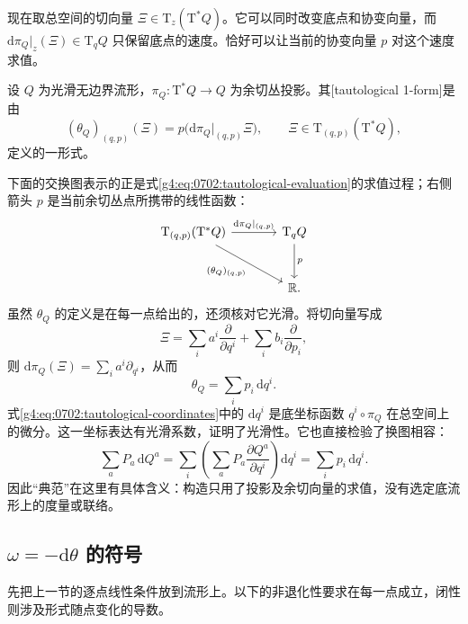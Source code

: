 现在取总空间的切向量 \(\Xi\in\mathrm{T}_z(\mathrm{T}^*Q)\)。它可以同时改变底点和协变向量，而 \(\mathrm{d}\pi_Q|_z(\Xi)\in\mathrm{T}_qQ\) 只保留底点的速度。恰好可以让当前的协变向量 \(p\) 对这个速度求值。

\begin{definition}
	\label{g4:def:0702:tautological-form}
	设 \(Q\) 为光滑无边界流形，\(\pi_Q:\mathrm{T}^*Q\to Q\) 为余切丛投影。其[tautological 1-form]是由
	\begin{equation}
		\label{g4:eq:0702:tautological-evaluation}
		(\theta_Q)_{(q,p)}(\Xi)
		=p\bigl(\mathrm{d}\pi_Q|_{(q,p)}\Xi\bigr),
		\qquad \Xi\in\mathrm{T}_{(q,p)}(\mathrm{T}^*Q),
	\end{equation}
	定义的一形式。
\end{definition}

下面的交换图表示的正是式\eqref{g4:eq:0702:tautological-evaluation}的求值过程；右侧箭头 \(p\) 是当前余切丛点所携带的线性函数：
\[
	\begin{tikzcd}[column sep=large,row sep=large]
		\mathrm{T}_{(q,p)}(\mathrm{T}^*Q)
		\arrow[r,"\mathrm{d}\pi_Q|_{(q,p)}"]
		\arrow[dr,swap,"(\theta_Q)_{(q,p)}"]
		& \mathrm{T}_qQ \arrow[d,"p"]\\
		& \mathbb R .
	\end{tikzcd}
\]
虽然 \(\theta_Q\) 的定义是在每一点给出的，还须核对它光滑。将切向量写成
\[
	\Xi=\sum_i a^i\frac{\partial}{\partial q^i}
	+\sum_i b_i\frac{\partial}{\partial p_i},
\]
则 \(\mathrm{d}\pi_Q(\Xi)=\sum_i a^i\partial_{q^i}\)，从而
\begin{equation}
	\label{g4:eq:0702:tautological-coordinates}
	\theta_Q=\sum_i p_i\,\mathrm{d}q^i.
\end{equation}
式\eqref{g4:eq:0702:tautological-coordinates}中的 \(\mathrm{d}q^i\) 是底坐标函数 \(q^i\circ\pi_Q\) 在总空间上的微分。这一坐标表达有光滑系数，证明了光滑性。它也直接检验了换图相容：
\[
	\sum_aP_a\,\mathrm{d}Q^a
	=\sum_i\left(\sum_aP_a\frac{\partial Q^a}{\partial q^i}\right)\mathrm{d}q^i
	=\sum_i p_i\,\mathrm{d}q^i.
\]
因此“典范”在这里有具体含义：构造只用了投影及余切向量的求值，没有选定底流形上的度量或联络。

\subsection{\texorpdfstring{\(\omega=-\mathrm{d}\theta\) 的符号}{\GeometryPdfSmallOmega{}=−d\GeometryPdfTheta{} 的符号}}
\label{g4:subsec:0702:02}

先把上一节的逐点线性条件放到流形上。以下的非退化性要求在每一点成立，闭性则涉及形式随点变化的导数。

